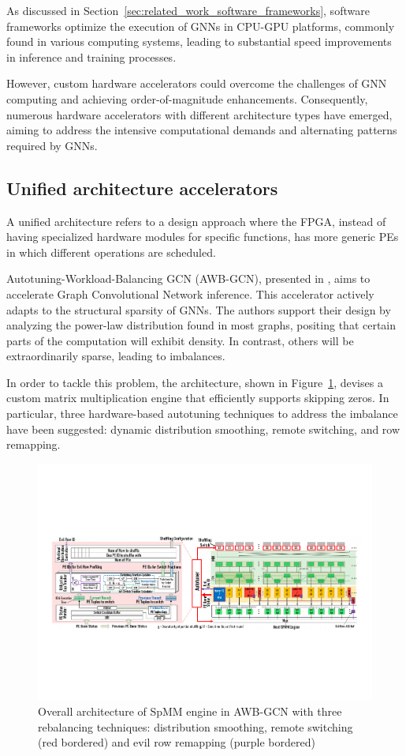 As discussed in Section~\ref{sec:related_work_software_frameworks}, software frameworks optimize the execution of GNNs in CPU-GPU platforms, commonly found in various computing systems, leading to substantial speed improvements in inference and training processes.

However, custom hardware accelerators could overcome the challenges of GNN computing and achieving order-of-magnitude enhancements.
Consequently, numerous hardware accelerators with different architecture types have emerged, aiming to address the intensive computational demands and alternating patterns required by GNNs.

\subsection{Unified architecture accelerators}\label{subsec:unified-architecture-accelerators}%

A unified architecture refers to a design approach where the FPGA, instead of having specialized hardware modules for specific functions, has more generic PEs in which different operations are scheduled.

Autotuning-Workload-Balancing GCN (AWB-GCN), presented in \cite{DBLP:journals/corr/abs-1908-10834}, aims to accelerate Graph Convolutional Network inference.
This accelerator actively adapts to the structural sparsity of GNNs. The authors support their design by analyzing the power-law distribution found in most graphs, positing that certain parts of the computation will exhibit density. In contrast, others will be extraordinarily sparse, leading to imbalances.

In order to tackle this problem, the architecture, shown in Figure~\ref{fig:awb_gcn_architecture}, devises a custom matrix multiplication engine that efficiently supports skipping zeros.
In particular, three hardware-based autotuning techniques to address the imbalance have been suggested: dynamic distribution smoothing, remote switching, and row remapping.

\begin{figure}[t]
    \centering
    \includegraphics[height=0.28\textwidth]{Images/AWB_GCN_SpMM_architecture}
    \caption[Overall architecture of SpMM engine in AWB-GCN~\cite{DBLP:journals/corr/abs-1908-10834}]{Overall architecture of SpMM engine in AWB-GCN with three rebalancing techniques: distribution smoothing, remote switching (red bordered) and evil row remapping (purple bordered)~\cite{DBLP:journals/corr/abs-1908-10834}}
    \label{fig:awb_gcn_architecture}
\end{figure}

